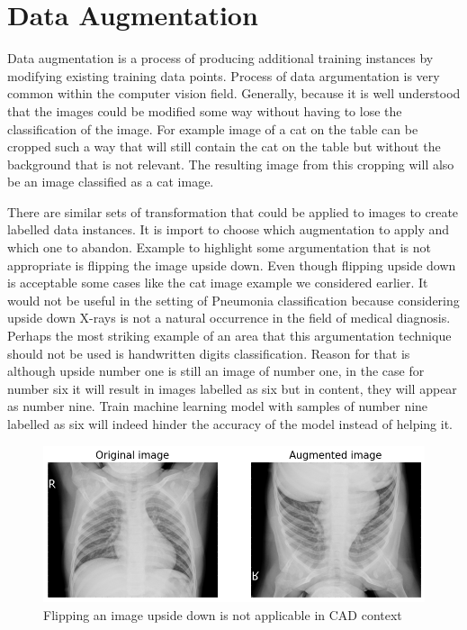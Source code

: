 \section{Data Augmentation} \label{sec:dataaug}
Data augmentation is a process of producing additional training instances by modifying existing training data points.
Process of data argumentation is very common within the computer vision field.
Generally, because it is well understood that the images could be modified some way without having to lose the classification of the image.
For example image of a cat on the table can be cropped such a way that will still contain the cat on the table but without the background that is not relevant.
The resulting image from this cropping will also be an image classified as a cat image.

There are similar sets of transformation that could be applied to images to create labelled data instances. 
It is import to choose which augmentation to apply and which one to abandon.
Example to highlight some argumentation that is not appropriate is flipping the image upside down. 
Even though flipping upside down is acceptable some cases like the cat image example we considered earlier. 
It would not be useful in the setting of Pneumonia classification because considering upside down X-rays is not a natural occurrence in the field of medical diagnosis.
Perhaps the most striking example of an area that this argumentation technique should not be used is handwritten digits classification. 
Reason for that is although upside number one is still an image of number one, in the case for number six it will result in images labelled as six but in content, they will appear as number nine. 
Train machine learning model with samples of number nine labelled as six will indeed hinder the accuracy of the model instead of helping it.

\begin{figure}[H]
    \centering
    \includegraphics[width=\textwidth]{img/augmented-image-1588951790.png}
    \caption{Flipping an image upside down is not applicable in CAD context}
    \label{fig:upsidedownxray}
  \end{figure}

